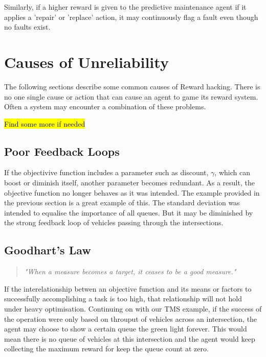 Similarly, if a higher reward is given to the predictive maintenance agent if it applies a 'repair' or 'replace' action, it may continuously flag a fault even though no faults exist. 

\section{Causes of Unreliability}
The following sections describe some common causes of Reward hacking.
There is no one single cause or action that can cause an agent to game its reward system. 
Often a system may encounter a combination of these problems.

\hl{Find some more if needed}

\subsection{Poor Feedback Loops}
If the objectivive function includes a parameter such as discount, $\gamma$, which can boost or diminish itself, another parameter becomes redundant.
As a result, the objective function no longer behaves as it was intended.
The example provided in the previous section is a great example of this. The standard deviation was intended to equalise the importance of all queues.
But it may be diminished by the strong feedback loop of vehicles passing through the intersections.

\subsection{Goodhart's Law}
\begin{quotation}
    \textit{"When a measure becomes a target, it ceases to be a good measure."}
\end{quotation}
If the interelationship betwen an objective function and its means or factors to successfully accomplishing a task is too high,
that relationship will not hold under heavy optimisation. 
Continuing on with our TMS example, if the success of the operation were only based on throuput of vehicles across an intersection,
the agent may choose to show a certain queue the green light forever. 
This would mean there is no queue of vehicles at this intersection and the agent would keep collecting the maximum reward for keep the queue count at zero.

